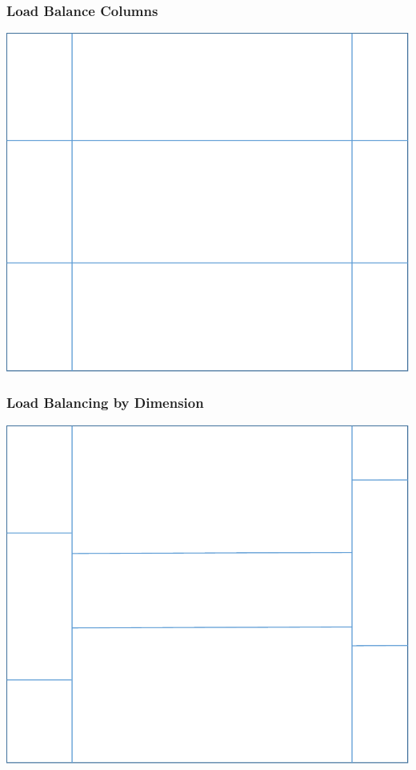 \documentclass[]{beamer}
\begin{document}
\begin{frame}[t]\frametitle{Load Balance Columns}
\centering
\includegraphics[scale=0.5]{figures/row_moves.pdf}
\end{frame}

\begin{frame}[t]\frametitle{Load Balancing by Dimension}
\centering
\includegraphics[scale=0.5]{figures/column_moves.pdf}
\end{frame}
\end{document}
